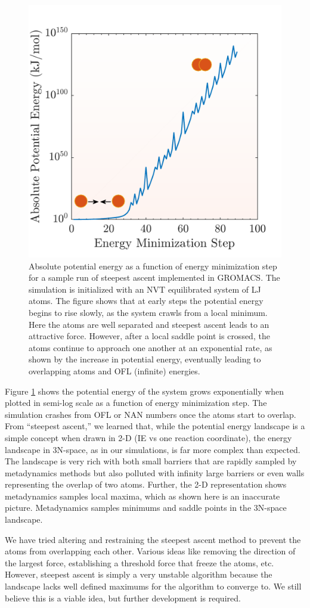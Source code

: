\begin{figure}[h]
	\centering
	\includegraphics[width=.5\textwidth]{./Figures/Appendix/ascent_result.pdf}
	\caption{Absolute potential energy as a function of energy minimization step for a sample run of steepest ascent implemented in GROMACS.  The simulation is initialized with an NVT equilibrated system of LJ atoms.  The figure shows that at early steps the potential energy begins to rise slowly, as the system crawls from a local minimum.  Here the atoms are well separated and steepest ascent leads to an attractive force.  However, after a local saddle point is crossed, the atoms continue to approach one another at an exponential rate, as shown by the increase in potential energy, eventually leading to overlapping atoms and OFL (infinite) energies.}
	\label{ascent_result}
\end{figure}

Figure \ref{ascent_result} shows the potential energy of the system grows exponentially when plotted in semi-log scale as a function of energy minimization step.  The simulation crashes from OFL or NAN numbers once the atoms start to overlap.  From ``steepest ascent,'' we learned that, while the potential energy landscape is a simple concept when drawn in 2-D (IE vs one reaction coordinate), the energy landscape in 3N-space, as in our simulations, is far more complex than expected.  The landscape is very rich with both small barriers that are rapidly sampled by metadynamics methods but also polluted with infinity large barriers or even walls representing the overlap of two atoms.  Further, the 2-D representation shows metadynamics samples local maxima, which as shown here is an inaccurate picture.  Metadynamics samples minimums and saddle points in the 3N-space landscape.  

We have tried altering and restraining the steepest ascent method to prevent the atoms from overlapping each other.  Various ideas like removing the direction of the largest force, establishing a threshold force that freeze the atoms, etc.  However, steepest ascent is simply a very unstable algorithm because the landscape lacks well defined maximums for the algorithm to converge to.  We still believe this is a viable idea, but further development is required.